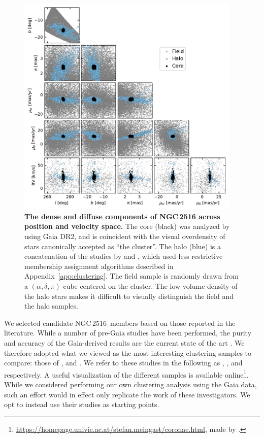 \documentclass[12pt,twocolumn,tighten]{aastex63}
\newcommand{\cn}{NGC\,2516} %
\begin{document}
\begin{figure}[t]
	\begin{center}
		\leavevmode
		\includegraphics[width=0.95\textwidth]{f1.pdf}
	\end{center}
	\vspace{-0.7cm}
  \caption{ {\bf The dense and diffuse components of NGC\,2516 across
  position and velocity space.} The core (black) was analyzed by
  \citet{cantatgaudin_gaia_2018} using Gaia DR2, and is coincident
  with the visual overdensity of stars canonically accepted as ``the
  cluster''.  The halo (blue) is a concatenation of the studies by
  \citet{kounkel_untangling_2019} and \citet{meingast_2021}, which
  used less restrictive membership assignment algorithms described in
  Appendix~\ref{app:clustering}.  The field sample is randomly drawn
  from a $(\alpha, \delta, \pi)$ cube centered on the cluster.  The
  low volume density of the halo stars makes it difficult to visually
  distinguish the field and the halo samples.
  \label{fig:gaia6d}
	}
\end{figure}

We selected candidate \cn\ members based on those reported in the
literature.  While a number of pre-Gaia 
studies have been performed, the
purity and accuracy of the Gaia-derived results are the current state
of the art \citep{jeffries_ngc2516_2001,Kharchenko_et_al_2013}.  We therefore adopted what we viewed as the most
interesting clustering samples to compare: those of
\citet{cantatgaudin_gaia_2018}, \citet{kounkel_untangling_2019} and
\citet{meingast_2021}.  We refer to these studies in the following as
,
, and 
respectively.  A useful visualization of the different samples is
available online\footnote{
  \url{https://homepage.univie.ac.at/stefan.meingast/coronae.html},
  made by \citet{meingast_2021}.}.  While we considered performing
our own clustering analysis using the Gaia data, such an effort would
in effect only replicate the work of these investigators.  We opt to
instead use their studies as starting points.
\end{document}
